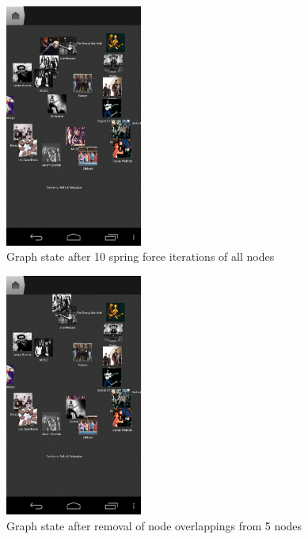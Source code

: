 \begin{figure}[H]
  \centering
    \includegraphics[width=0.4\textwidth]{figures/screen_mds_7_after_10_cleanup_iterations}
  \caption{Graph state after 10 spring force iterations of all nodes}
\end{figure}

\begin{figure}[H]
  \centering
    \includegraphics[width=0.4\textwidth]{figures/screen_mds_8_after_5_uncollided_nodes}
  \caption{Graph state after removal of node overlappings from 5 nodes}
\end{figure}


